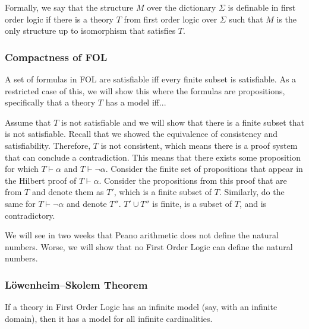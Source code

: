 \documentclass{idc_msc}
\begin{document}

Formally, we say that the structure \(M\) over the dictionary \(\Sigma\) is definable in first order logic if there is a theory \(T\) from first order logic over \(\Sigma\) such that \(M\) is the only structure up to isomorphism that satisfies \(T\).

\subsubsection{Compactness of FOL}

A set of formulas in FOL are satisfiable iff every finite subset is satisfiable.
As a restricted case of this, we will show this where the formulas are propositions, specifically that a theory \(T\) has a model iff...


Assume that \(T\) is not satisfiable and we will show that there is a finite subset that is not satisfiable.
Recall that we showed the equivalence of consistency and satisfiability.
Therefore, \(T\) is not consistent, which means there is a proof system that can conclude a contradiction.
This means that there exists some proposition for which \(T \vdash \alpha\) and \(T \vdash \lnot \alpha\).
Consider the finite set of propositions that appear in the Hilbert proof of \(T \vdash \alpha\).
Consider the propositions from this proof that are from \(T\) and denote them as \(T'\), which is a finite subset of \(T\).
Similarly, do the same for \(T \vdash \lnot \alpha\) and denote \(T''\).
\(T' \cup T''\) is finite, is a subset of \(T\), and is contradictory.

We will see in two weeks that Peano arithmetic does not define the natural numbers.
Worse, we will show that no First Order Logic can define the natural numbers.

\subsubsection{L\"owenheim–Skolem Theorem}

If a theory in First Order Logic has an infinite model (say, with an infinite domain), then it has a model for all infinite cardinalities.
\end{document}
